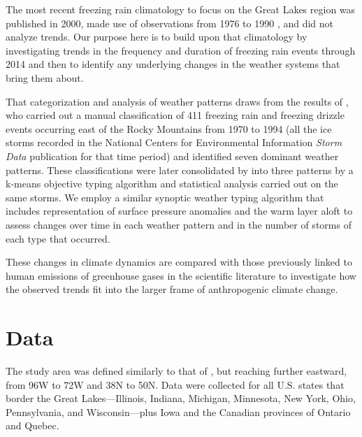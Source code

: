 \documentclass[twocol]{ametsoc}
\begin{document}
The most recent freezing rain climatology to focus on the Great Lakes region was published in 2000, made use of observations from 1976 to 1990 \citep{cortinas2000climatology}, and did not analyze trends. Our purpose here is to build upon that climatology by investigating trends in the frequency and duration of freezing rain events through 2014 and then to identify any underlying changes in the weather systems that bring them about. 

That categorization and analysis of weather patterns draws from the results of \citet{rauber2001synoptic}, who carried out a manual classification of 411 freezing rain and freezing drizzle events occurring east of the Rocky Mountains from 1970 to 1994 (all the ice storms recorded in the National Centers for Environmental Information \textit{Storm Data} publication for that time period) and identified seven dominant weather patterns. These classifications were later consolidated by \citet{erfani2012automated} into three patterns by a k-means objective typing algorithm and statistical analysis carried out on the same storms. We employ a similar synoptic weather typing algorithm that includes representation of surface pressure anomalies and the warm layer aloft to assess changes over time in each weather pattern and in the number of storms of each type that occurred.

These changes in climate dynamics are compared with those previously linked to human emissions of greenhouse gases in the scientific literature to investigate how the observed trends fit into the larger frame of anthropogenic climate change.

\section{Data}
The study area was defined similarly to that of \citet{cortinas2000climatology}, but reaching further eastward, from 96\degree W to 72\degree W and 38\degree N to 50\degree N. Data were collected for all U.S. states that border the Great Lakes---Illinois, Indiana, Michigan, Minnesota, New York, Ohio, Pennsylvania, and Wisconsin---plus Iowa and the Canadian provinces of Ontario and Quebec.
\end{document}
